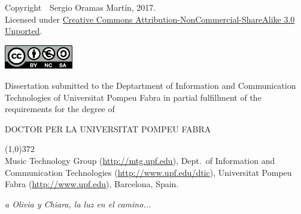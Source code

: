\cleartorecto
\thispagestyle{empty}

{\footnotesize Copyright~\textcopyright~Sergio Oramas Martín, 2017.}
\\{\footnotesize Licensed under \href{http://creativecommons.org/licenses/by-nc-sa/3.0/}{Creative Commons Attribution-NonCommercial-ShareAlike 3.0 Unported}.}

\href{http://creativecommons.org/licenses/by-nc-sa/3.0/}{\includegraphics[width=3cm]{ch00_pics/creative-commons2.png}}


\vspace*{5cm}


Dissertation submitted to the Deptartment of Information and Communication Technologies of Universitat Pompeu Fabra in partial fulfillment of the requirements for the degree of

\vspace*{0.5cm}

\centerline{DOCTOR PER LA UNIVERSITAT POMPEU FABRA}

\vspace*{0.6cm}



\vspace*{\fill}

\line(1,0){372}\\
\footnotesize
Music Technology Group (\url{http://mtg.upf.edu}), Dept.~of Information and Communication Technologies (\url{http://www.upf.edu/dtic}), Universitat Pompeu Fabra (\url{http://www.upf.edu}), Barcelona, Spain.
\normalsize


\cleartorecto



\cleartorecto



\cleartorecto
\thispagestyle{empty}
\vspace*{3cm}
\begin{flushright}
\textit{a Olivia y Chiara, la luz en el camino...}
\end{flushright}

